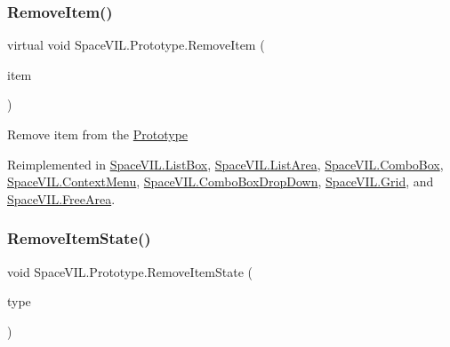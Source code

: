 \subsubsection{\texorpdfstring{Remove\+Item()}{RemoveItem()}}
{\footnotesize\ttfamily virtual void Space\+V\+I\+L.\+Prototype.\+Remove\+Item (\begin{DoxyParamCaption}\item[{\mbox{\hyperlink{interface_space_v_i_l_1_1_core_1_1_i_base_item}{I\+Base\+Item}}}]{item }\end{DoxyParamCaption})\hspace{0.3cm}{\ttfamily [virtual]}}



Remove item from the \mbox{\hyperlink{class_space_v_i_l_1_1_prototype}{Prototype}} 



Reimplemented in \mbox{\hyperlink{class_space_v_i_l_1_1_list_box_a3fac47d275899619c3f705c24816ff87}{Space\+V\+I\+L.\+List\+Box}}, \mbox{\hyperlink{class_space_v_i_l_1_1_list_area_a0020756686088a62a43388973fa2d7bf}{Space\+V\+I\+L.\+List\+Area}}, \mbox{\hyperlink{class_space_v_i_l_1_1_combo_box_a646108f1b822d481ae32b68e7bd3f44f}{Space\+V\+I\+L.\+Combo\+Box}}, \mbox{\hyperlink{class_space_v_i_l_1_1_context_menu_a35bae3cc791ba6de129af36ddb0fb63b}{Space\+V\+I\+L.\+Context\+Menu}}, \mbox{\hyperlink{class_space_v_i_l_1_1_combo_box_drop_down_a78a089740c66f8d4cf151da273eafd73}{Space\+V\+I\+L.\+Combo\+Box\+Drop\+Down}}, \mbox{\hyperlink{class_space_v_i_l_1_1_grid_a75bf61cabb387baea7461141dce079fb}{Space\+V\+I\+L.\+Grid}}, and \mbox{\hyperlink{class_space_v_i_l_1_1_free_area_ae9b39df00c0fa786b4072b8e49e3aacc}{Space\+V\+I\+L.\+Free\+Area}}.

\mbox{\label{class_space_v_i_l_1_1_prototype_a2c7109a2346956afe3e03958e6d2701c}} 
\subsubsection{\texorpdfstring{Remove\+Item\+State()}{RemoveItemState()}}
{\footnotesize\ttfamily void Space\+V\+I\+L.\+Prototype.\+Remove\+Item\+State (\begin{DoxyParamCaption}\item[{Item\+State\+Type}]{type }\end{DoxyParamCaption})}



